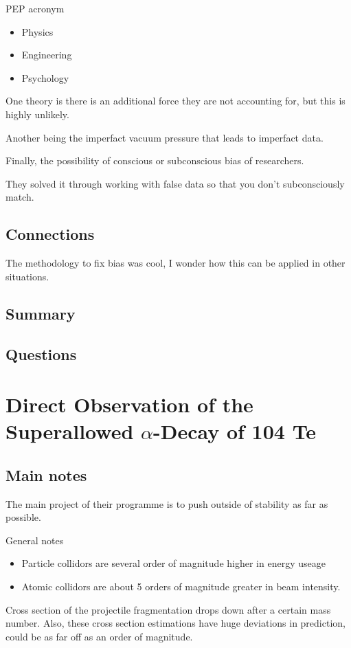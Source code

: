 PEP acronym
\begin{itemize}
	\item Physics
  \item Engineering
  \item Psychology
\end{itemize}
One theory is there is an additional force they are not accounting for, but this is highly unlikely.

Another being the imperfact vacuum pressure that leads to imperfact data.

Finally, the possibility of conscious or subconscious bias of researchers.

They solved it through working with false data so that you don't subconsciously match.

\subsection{Connections}

The methodology to fix bias was cool, I wonder how this can be applied in other situations.
\subsection{Summary}


\subsection{Questions}



\section{Direct Observation of the Superallowed $\alpha$-Decay of 104 Te}
\subsection{Main notes}
The main project of their programme is to push outside of stability as far as possible.

General notes
\begin{itemize}
	\item Particle collidors are several order of magnitude higher in energy useage
  \item Atomic collidors are about 5 orders of magnitude greater in beam intensity.
\end{itemize}
Cross section of the projectile fragmentation drops down after a certain mass number. Also, these cross section estimations have huge deviations in prediction, could be as far off as an order of magnitude.

